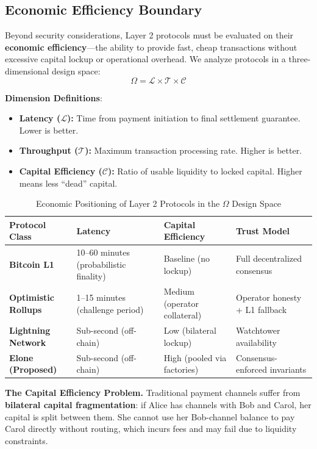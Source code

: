 \subsection{Economic Efficiency Boundary}

Beyond security considerations, Layer 2 protocols must be evaluated on their \textbf{economic efficiency}---the ability to provide fast, cheap transactions without excessive capital lockup or operational overhead. We analyze protocols in a three-dimensional design space:
$$\Omega = \mathcal{L} \times \mathcal{T} \times \mathcal{C}$$

\textbf{Dimension Definitions}:
\begin{itemize}
    \item \textbf{Latency ($\mathcal{L}$):} Time from payment initiation to final settlement guarantee. Lower is better.
    \item \textbf{Throughput ($\mathcal{T}$):} Maximum transaction processing rate. Higher is better.
    \item \textbf{Capital Efficiency ($\mathcal{C}$):} Ratio of usable liquidity to locked capital. Higher means less ``dead'' capital.
\end{itemize}

\begin{table}[htbp]
\centering
\caption{Economic Positioning of Layer 2 Protocols in the $\Omega$ Design Space}
\label{tab:economics}
\small
\begin{tabularx}{\linewidth}{@{}p{2.2cm}XXX@{}}
\toprule
\textbf{Protocol Class} & \textbf{Latency} & \textbf{Capital Efficiency} & \textbf{Trust Model} \\
\midrule
\textbf{Bitcoin L1} & 10--60 minutes (probabilistic finality) & Baseline (no lockup) & Full decentralized consensus \\
\addlinespace
\textbf{Optimistic Rollups} & 1--15 minutes (challenge period) & Medium (operator collateral) & Operator honesty + L1 fallback \\
\addlinespace
\textbf{Lightning Network} & Sub-second (off-chain) & Low (bilateral lockup) & Watchtower availability \\
\addlinespace
\textbf{Elone (Proposed)} & Sub-second (off-chain) & High (pooled via factories) & Consensus-enforced invariants \\
\bottomrule
\end{tabularx}
\end{table}

\textbf{The Capital Efficiency Problem.} Traditional payment channels suffer from \textbf{bilateral capital fragmentation}: if Alice has channels with Bob and Carol, her capital is split between them. She cannot use her Bob-channel balance to pay Carol directly without routing, which incurs fees and may fail due to liquidity constraints.

